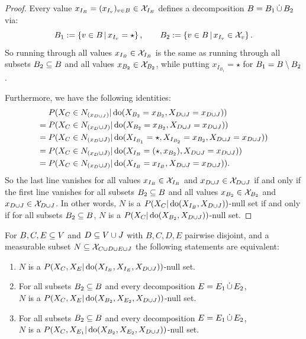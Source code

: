 \begin{proof}
  Every value $x_{I_B}=(x_{I_v})_{v \in B} \in \mathcal{X}_{I_B}$ defines a decomposition $B=B_1 \,\dot{\cup}\, B_2$ via:
  \[ B_1 := \left \{ v \in B \,\middle|\, x_{I_v} = \star \right \}, \qquad B_2 := \left \{ v \in B \,\middle|\, x_{I_v} \in \mathcal{X}_v \right \}.  \]
  So running through all values $x_{I_B} \in \mathcal{X}_{I_B}$ is the same as running through all subsets $B_2 \subseteq B$ and all values $x_{B_2} \in \mathcal{X}_{B_2}$, while putting $x_{I_{B_1}}=\star$ for $B_1 = B \setminus B_2$.

  Furthermore, we have the following identities:
  \begin{align*}
      & P(X_C \in N_{(x_{D\cup J})} |\operatorname{do}(X_{B_2}=x_{B_2},X_{D\cup J}=x_{D \cup J})) \\
      ={}& P(X_C \in N_{(x_D \cup J)} |\operatorname{do}(X_{B_2}=x_{B_2},X_{D\cup J}=x_{D \cup J}))\\
      ={}& P(X_C \in N_{(x_D \cup J)} |\operatorname{do}(X_{I_{B_1}}=\star, X_{I_{B_2}}=x_{B_2},X_{D\cup J}=x_{D \cup J}))\\
      ={}& P(X_C \in N_{(x_D \cup J)} |\operatorname{do}(X_{I_B}=(\star,x_{B_2}),X_{D\cup J}=x_{D \cup J}))\\
      ={}& P(X_C \in N_{(x_D \cup J)} |\operatorname{do}(X_{I_B}=x_{I_B},X_{D\cup J}=x_{D \cup J})).
  \end{align*}
  So the last line vanishes for all values $x_{I_B} \in \mathcal{X}_{I_B}$ and $x_{D\cup J} \in \mathcal{X}_{D\cup J}$ if and only if the first line vanishes for all subsets $B_2 \subseteq B$ and all values $x_{B_2} \in \mathcal{X}_{B_2}$ and $x_{D\cup J} \in \mathcal{X}_{D\cup J}$.
  In other words, $N$ is a $P(X_C|\operatorname{do}(X_{I_B},X_{D\cup J}))$-null set if and only if for all subsets $B_2 \subseteq B$, $N$ is a $P(X_C|\operatorname{do}(X_{B_2},X_{D\cup J}))$-null set.
\end{proof}
\begin{Cor}\label{cor:int-null-set-combined}
  For $B,C,E \subseteq V$ and $D \subseteq V \cup J$ with $B,C,D,E$ pairwise disjoint, and a measurable  subset $N \subseteq \mathcal{X}_{C \cup D \cup E \cup J}$ the following statements are equivalent:
    \begin{enumerate}
      \item $N$ is a $P(X_C,X_E|\operatorname{do}(X_{I_B},X_{I_E},X_{D\cup J}))$-null set.
      \item For all subsets $B_2 \subseteq B$ and every decomposition $E=E_1 \,\dot{\cup}\, E_2$,\\ $N$ is a $P(X_C,X_E|\operatorname{do}(X_{B_2},X_{E_2},X_{D\cup J}))$-null set.
      \item For all subsets $B_2 \subseteq B$ and every decomposition $E=E_1 \,\dot{\cup}\, E_2$,\\ $N$ is a $P(X_C,X_{E_1}|\operatorname{do}(X_{B_2},X_{E_2},X_{D\cup J}))$-null set.
    \end{enumerate}
\end{Cor}
